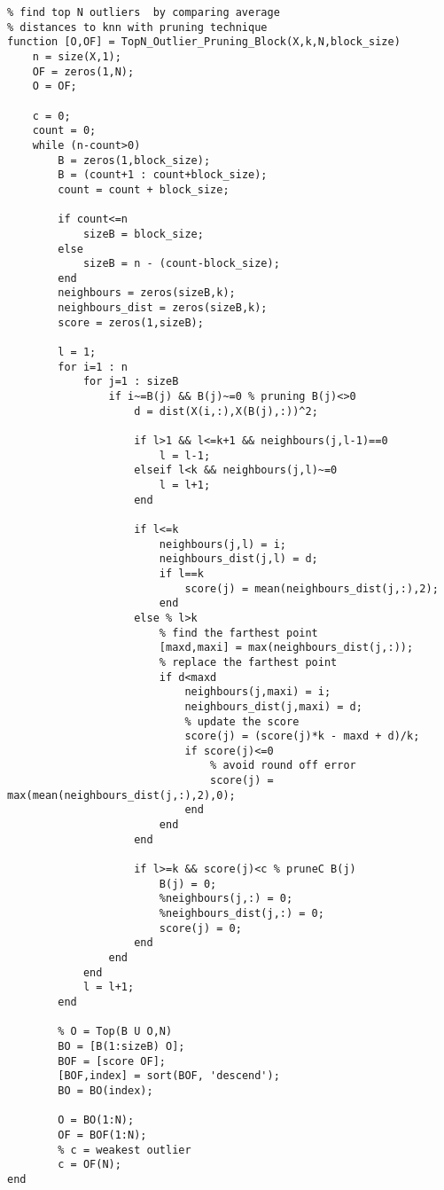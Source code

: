 \lstset{numbers=left,tabsize=2,language=Matlab}
\begin{lstlisting}
% find top N outliers  by comparing average 
% distances to knn with pruning technique
function [O,OF] = TopN_Outlier_Pruning_Block(X,k,N,block_size)
	n = size(X,1);
	OF = zeros(1,N);
	O = OF;

	c = 0;
	count = 0;
	while (n-count>0)
		B = zeros(1,block_size);
		B = (count+1 : count+block_size);
		count = count + block_size;        
		
		if count<=n
			sizeB = block_size;
		else
			sizeB = n - (count-block_size);
		end
		neighbours = zeros(sizeB,k);
		neighbours_dist = zeros(sizeB,k);
		score = zeros(1,sizeB);

		l = 1;
		for i=1 : n
			for j=1 : sizeB
				if i~=B(j) && B(j)~=0 % pruning B(j)<>0
					d = dist(X(i,:),X(B(j),:))^2;
		            
					if l>1 && l<=k+1 && neighbours(j,l-1)==0
						l = l-1;
					elseif l<k && neighbours(j,l)~=0
						l = l+1;
					end
		            
					if l<=k 
						neighbours(j,l) = i;   
						neighbours_dist(j,l) = d;
						if l==k
							score(j) = mean(neighbours_dist(j,:),2);
						end
					else % l>k
						% find the farthest point
						[maxd,maxi] = max(neighbours_dist(j,:));
						% replace the farthest point
						if d<maxd 
							neighbours(j,maxi) = i;
							neighbours_dist(j,maxi) = d;
							% update the score
							score(j) = (score(j)*k - maxd + d)/k;
							if score(j)<=0
								% avoid round off error
								score(j) = max(mean(neighbours_dist(j,:),2),0);
							end
						end                    
					end
		            
					if l>=k && score(j)<c % pruneC B(j)
						B(j) = 0;                    
						%neighbours(j,:) = 0;
						%neighbours_dist(j,:) = 0;
						score(j) = 0;                   
					end                                            
				end
			end
			l = l+1;
		end
		
		% O = Top(B U O,N)
		BO = [B(1:sizeB) O];
		BOF = [score OF];
		[BOF,index] = sort(BOF, 'descend');
		BO = BO(index);
		
		O = BO(1:N);
		OF = BOF(1:N);    
		% c = weakest outlier
		c = OF(N);
end
\end{lstlisting}
